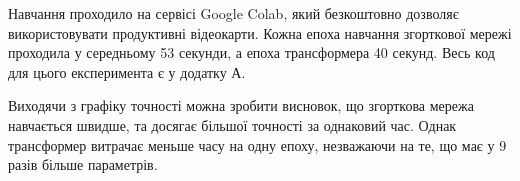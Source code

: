 Навчання проходило на сервісі Google Colab, який безкоштовно
дозволяє використовувати продуктивні відеокарти. Кожна епоха
навчання згорткової мережі проходила у середньому 53 секунди,
а епоха трансформера 40 секунд.
Весь код для цього експеримента є у додатку А.

Виходячи з графіку точності можна зробити висновок, що згорткова
мережа навчається швидше, та досягає більшої точності за однаковий час.
Однак трансформер витрачає меньше часу на одну епоху, незважаючи
на те, що має у 9 разів більше параметрів.
